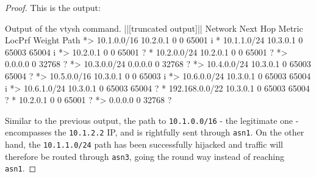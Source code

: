 \documentclass[a4paper,11pt,hidelinks]{article}
\begin{document}
\begin{proof}
    This is the output:

\begin{code}{Output of the vtysh command.}
||[truncated output]||
Network          Next Hop            Metric LocPrf Weight Path
*> 10.1.0.0/16      10.2.0.1                 0             0 65001 i
*  10.1.1.0/24      10.3.0.1                               0 65003 65004 i
*>                  10.2.0.1                 0             0 65001 ?
*  10.2.0.0/24      10.2.0.1                 0             0 65001 ?
*>                  0.0.0.0                  0         32768 ?
*> 10.3.0.0/24      0.0.0.0                  0         32768 ?
*> 10.4.0.0/24      10.3.0.1                               0 65003 65004 ?
*> 10.5.0.0/16      10.3.0.1                 0             0 65003 i
*> 10.6.0.0/24      10.3.0.1                               0 65003 65004 i
*> 10.6.1.0/24      10.3.0.1                               0 65003 65004 ?
*  192.168.0.0/22   10.3.0.1                               0 65003 65004 ?
*                   10.2.0.1                 0             0 65001 ?
*>                  0.0.0.0                  0         32768 ?
\end{code}

    Similar to the previous output, the path to \verb=10.1.0.0/16= - the legitimate one - encompasses the \verb=10.1.2.2= IP, and is rightfully sent through \verb=asn1=. On the other hand, the \verb=10.1.1.0/24= path has been successfully hijacked and traffic will therefore be routed through \verb=asn3=, going the round way instead of reaching \verb=asn1=.
\end{proof}
\endgroup
\end{document}
